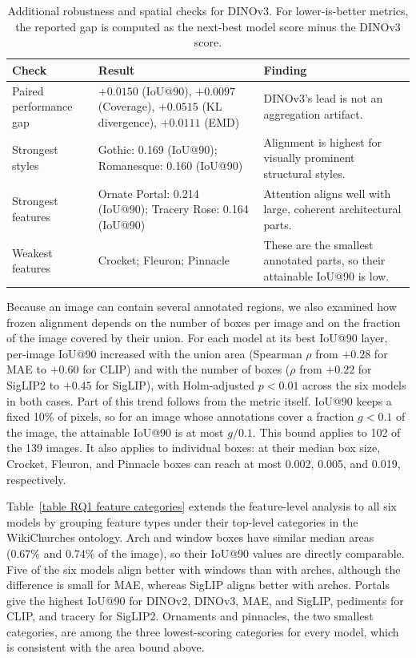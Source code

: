 \documentclass[lineno,pdflatex,sn-mathphys-num]{sn-jnl}%
\theoremstyle{thmstyleone}%
\theoremstyle{thmstyletwo}%
\theoremstyle{thmstylethree}%
\begin{document}
\begin{table}[!h]
\centering
\caption{Additional robustness and spatial checks for DINOv3. For lower-is-better metrics, the reported gap is computed as the next-best model score minus the DINOv3 score.\label{table RQ1 dinov3}}
\begin{tabular}{lp{}p{}}
\toprule
Check & Result & Finding \\ \midrule
Paired performance gap & $+0.0150$ (IoU@90), $+0.0097$ (Coverage), $+0.0515$ (KL divergence), $+0.0111$ (EMD) & DINOv3's lead is not an aggregation artifact. \\
Strongest styles & Gothic: 0.169 (IoU@90); Romanesque: 0.160 (IoU@90) & Alignment is highest for visually prominent structural styles. \\
Strongest features & Ornate Portal: 0.214 (IoU@90); Tracery Rose: 0.164 (IoU@90) & Attention aligns well with large, coherent architectural parts. \\
Weakest features & Crocket; Fleuron; Pinnacle & These are the smallest annotated parts, so their attainable IoU@90 is low. \\
\bottomrule
\end{tabular}
\end{table}

Because an image can contain several annotated regions, we also examined how frozen alignment depends on the number of boxes per image and on the fraction of the image covered by their union. For each model at its best IoU@90 layer, per-image IoU@90 increased with the union area (Spearman $\rho$ from $+0.28$ for MAE to $+0.60$ for CLIP) and with the number of boxes ($\rho$ from $+0.22$ for SigLIP2 to $+0.45$ for SigLIP), with Holm-adjusted $p < 0.01$ across the six models in both cases. Part of this trend follows from the metric itself. IoU@90 keeps a fixed 10\% of pixels, so for an image whose annotations cover a fraction $g<0.1$ of the image, the attainable IoU@90 is at most $g/0.1$. This bound applies to 102 of the 139 images. It also applies to individual boxes: at their median box size, Crocket, Fleuron, and Pinnacle boxes can reach at most 0.002, 0.005, and 0.019, respectively.

Table~\ref{table RQ1 feature categories} extends the feature-level analysis to all six models by grouping feature types under their top-level categories in the WikiChurches ontology. Arch and window boxes have similar median areas (0.67\% and 0.74\% of the image), so their IoU@90 values are directly comparable. Five of the six models align better with windows than with arches, although the difference is small for MAE, whereas SigLIP aligns better with arches. Portals give the highest IoU@90 for DINOv2, DINOv3, MAE, and SigLIP, pediments for CLIP, and tracery for SigLIP2. Ornaments and pinnacles, the two smallest categories, are among the three lowest-scoring categories for every model, which is consistent with the area bound above.
\end{document}

